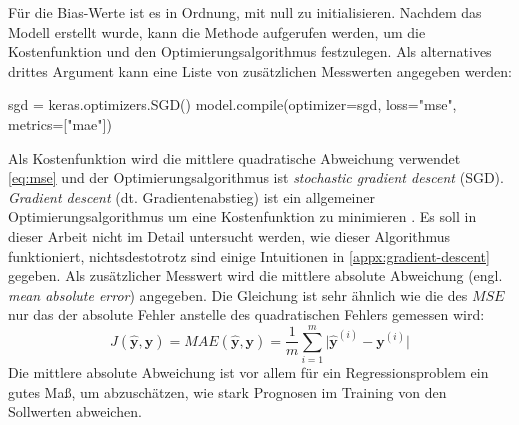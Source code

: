 Für die Bias-Werte ist es in Ordnung, mit null zu initialisieren.
Nachdem das Modell erstellt wurde, kann die 
Methode aufgerufen werden, um die Kostenfunktion und den
Optimierungsalgorithmus festzulegen.
Als alternatives drittes Argument kann eine Liste von
zusätzlichen Messwerten angegeben werden:
\begin{pythoncode}
sgd = keras.optimizers.SGD()
model.compile(optimizer=sgd, loss="mse", metrics=["mae"])
\end{pythoncode}
Als Kostenfunktion wird die mittlere quadratische Abweichung verwendet
\eqref{eq:mse} und der Optimierungsalgorithmus ist
\textit{stochastic gradient descent} (SGD). \textit{Gradient descent}
(dt. Gradientenabstieg) ist ein allgemeiner Optimierungsalgorithmus
um eine Kostenfunktion zu minimieren \parencite[118]{book:hands-on-ml}.
Es soll in dieser Arbeit nicht im Detail untersucht werden, wie dieser
Algorithmus funktioniert, nichtsdestotrotz sind einige Intuitionen
in \autoref{appx:gradient-descent} gegeben.
Als zusätzlicher Messwert wird die mittlere absolute Abweichung
(engl. \textit{mean absolute error}) angegeben.
Die Gleichung ist sehr ähnlich wie die des $MSE$ nur das der absolute Fehler
anstelle des quadratischen Fehlers gemessen wird:
\begin{equation}
  J(\mathbf{\hat{y}}, \mathbf{y}) =
  MAE(\mathbf{\hat{y}}, \mathbf{y}) =
    \frac{1}{m} \sum_{i=1}^{m} \vert\mathbf{\hat{y}}^{(i)} - \mathbf{y}^{(i)}\vert
  \label{eq:mae}
\end{equation}
Die mittlere absolute Abweichung ist vor allem für ein Regressionsproblem
ein gutes Maß, um abzuschätzen, wie stark Prognosen im Training von
den Sollwerten abweichen.


